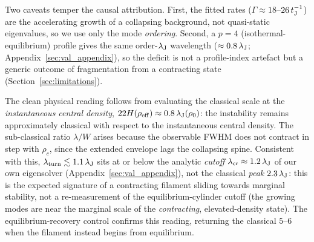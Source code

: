 \documentclass[usenatbib,twoside,twocolumn]{mnras}
\begin{document}
Two caveats temper the causal attribution. First, the fitted rates ($\Gamma\approx18$--$26\,t_{\rm J}^{-1}$) are the accelerating growth of a collapsing background, not quasi-static eigenvalues, so we use only the mode \emph{ordering}. Second, a $p=4$ (isothermal-equilibrium) profile gives the same order-$\lambda_{\rm J}$ wavelength ($\approx0.8\,\lambda_{\rm J}$; Appendix~\ref{sec:val_appendix}), so the deficit is not a profile-index artefact but a generic outcome of fragmentation from a contracting state (Section~\ref{sec:limitations}).

The clean physical reading follows from evaluating the classical scale at the \emph{instantaneous central density}, $22H(\rho_{\rm eff})\approx0.8\,\lambda_{\rm J}(\rho_0)$: the instability remains approximately classical with respect to the instantaneous central density. The sub-classical ratio $\lambda/W$ arises because the observable FWHM does not contract in step with $\rho_c$, since the extended envelope lags the collapsing spine. Consistent with this, $\lambda_{\rm turn}\lesssim1.1\,\lambda_{\rm J}$ sits at or below the analytic \emph{cutoff} $\lambda_{\rm cr}\approx1.2\,\lambda_{\rm J}$ of our own eigensolver (Appendix~\ref{sec:val_appendix}), not the classical \emph{peak} $2.3\,\lambda_{\rm J}$: this is the expected signature of a contracting filament sliding towards marginal stability, not a re-measurement of the equilibrium-cylinder cutoff (the growing modes are near the marginal scale of the \emph{contracting}, elevated-density state). The equilibrium-recovery control confirms this reading, returning the classical $5$--$6$ when the filament instead begins from equilibrium.
\end{document}
